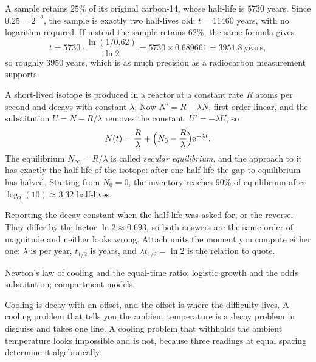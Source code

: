 \begin{worked}
A sample retains $25\%$ of its original carbon-14, whose half-life is $5730$ years. Since $0.25=2^{-2}$, the sample is exactly two half-lives old: $t=11460$ years, with no logarithm required. If instead the sample retains $62\%$, the same formula gives
\[t=5730\cdot\frac{\ln(1/0.62)}{\ln2}=5730\times0.689661=3951.8\ \text{years},\]
so roughly $3950$ years, which is as much precision as a radiocarbon measurement supports.
\end{worked}

\begin{worked}
A short-lived isotope is produced in a reactor at a constant rate $R$ atoms per second and decays with constant $\lambda$. Now $N'=R-\lambda N$, first-order linear, and the substitution $U=N-R/\lambda$ removes the constant: $U'=-\lambda U$, so
\[N(t)=\frac{R}{\lambda}+\Bigl(N_0-\frac{R}{\lambda}\Bigr)\mathrm{e}^{-\lambda t}.\]
The equilibrium $N_\infty=R/\lambda$ is called \emph{secular equilibrium}, and the approach to it has exactly the half-life of the isotope: after one half-life the gap to equilibrium has halved. Starting from $N_0=0$, the inventory reaches $90\%$ of equilibrium after $\log_2(10)\approx3.32$ half-lives.
\end{worked}

\begin{trap}
Reporting the decay constant when the half-life was asked for, or the reverse. They differ by the factor $\ln2\approx0.693$, so both answers are the same order of magnitude and neither looks wrong. Attach units the moment you compute either one: $\lambda$ is per year, $t_{1/2}$ is years, and $\lambda t_{1/2}=\ln 2$ is the relation to quote.
\end{trap}

\begin{seealsob}Newton's law of cooling and the equal-time ratio; logistic growth and the odds substitution; compartment models.\end{seealsob}

Cooling is decay with an offset, and the offset is where the difficulty lives. A cooling problem that tells you the ambient temperature is a decay problem in disguise and takes one line. A cooling problem that withholds the ambient temperature looks impossible and is not, because three readings at equal spacing determine it algebraically.

